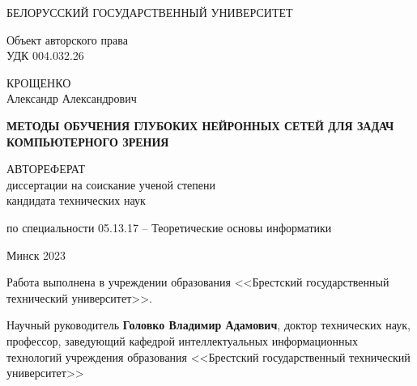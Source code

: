 \documentclass{thesisby}
\begin{document}
\thispagestyle{empty}

\begin{center} 

\bfseries
\medskip

{БЕЛОРУССКИЙ ГОСУДАРСТВЕННЫЙ УНИВЕРСИТЕТ}


\vspace{2cm}
\end{center}

\noindent Объект авторского права\\
\noindent УДК 004.032.26 \\[5mm]

\begin{center}

{КРОЩЕНКО \\ Александр Александрович}\\

\vspace{1cm}

{\bfseries МЕТОДЫ ОБУЧЕНИЯ ГЛУБОКИХ НЕЙРОННЫХ СЕТЕЙ 
ДЛЯ ЗАДАЧ КОМПЬЮТЕРНОГО ЗРЕНИЯ}\\ \vspace{2cm}

АВТОРЕФЕРАТ\\ диссертации на соискание ученой степени\\
кандидата технических наук\\
\medskip



    
\vspace{1cm}
по специальности 05.13.17 -- Теоретические основы информатики 

\vspace*{\fill}


Минск 2023
\end{center}


\newpage

\thispagestyle{empty} 

\noindent Работа выполнена в учреждении образования <<Брестский государственный технический университет>>.

\vspace*{\fill} 

 

\noindent \hangindent=70mm 
     Научный руководитель \hspace{10mm} {\bf Головко Владимир Адамович}, доктор технических наук, профессор, заведующий кафедрой интеллектуальных информационных технологий учреждения образования <<Брестский государственный технический университет>>\\
            
\end{document}
